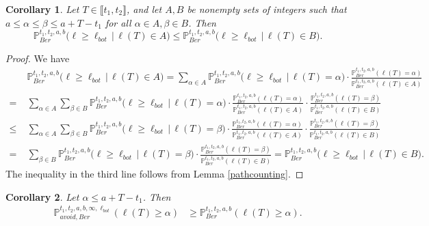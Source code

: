 \documentclass[12pt]{article}
\newtheorem{cor}{Corollary}
\begin{document}
	\begin{cor}\label{setpathcounting}
		Let $T\in\llbracket t_1, t_2\rrbracket$, and let $A, B$ be nonempty sets of integers such that $a \leq \alpha \leq \beta \leq a+T-t_1$ for all $\alpha\in A, \beta\in B$. Then
		\[
		\mathbb{P}^{t_1, t_2, a, b}_{Ber}\big(\ell \geq \ell_{bot}\,\big|\,\ell(T) \in A\big) \leq \mathbb{P}^{t_1, t_2, a, b}_{Ber}\big(\ell \geq \ell_{bot}\,\big|\,\ell(T) \in B\big).
		\]
	\end{cor}

	\begin{proof}
		We have
		\begin{align*}
			& \mathbb{P}^{t_1, t_2, a, b}_{Ber}\big(\ell \geq \ell_{bot}\,\big|\,\ell(T) \in A\big) = \sum_{\alpha\in A} \mathbb{P}^{t_1, t_2, a, b}_{Ber}\big(\ell \geq \ell_{bot}\,\big|\,\ell(T) = \alpha\big) \cdot \frac{\mathbb{P}^{t_1, t_2, a, b}_{Ber}(\ell(T) = \alpha)}{\mathbb{P}^{t_1, t_2, a, b}_{Ber}(\ell(T) \in A)}\\
			= \; & \sum_{\alpha\in A}\sum_{\beta\in B} \mathbb{P}^{t_1, t_2, a, b}_{Ber}\big(\ell \geq \ell_{bot}\,\big|\,\ell(T) = \alpha\big) \cdot \frac{\mathbb{P}^{t_1, t_2, a, b}_{Ber}(\ell(T) = \alpha)}{\mathbb{P}^{t_1, t_2, a, b}_{Ber}(\ell(T) \in A)} \cdot \frac{\mathbb{P}^{t_1, t_2, a, b}_{Ber}(\ell(T) = \beta)}{\mathbb{P}^{t_1, t_2, a, b}_{Ber}(\ell(T) \in B)}\\
			\leq \; & \sum_{\alpha\in A}\sum_{\beta\in B} \mathbb{P}^{t_1, t_2, a, b}_{Ber}\big(\ell \geq \ell_{bot}\,\big|\,\ell(T) = \beta\big) \cdot \frac{\mathbb{P}^{t_1, t_2, a, b}_{Ber}(\ell(T) = \alpha)}{\mathbb{P}^{t_1, t_2, a, b}_{Ber}(\ell(T) \in A)} \cdot \frac{\mathbb{P}^{t_1, t_2, a, b}_{Ber}(\ell(T) = \beta)}{\mathbb{P}^{t_1, t_2, a, b}_{Ber}(\ell(T) \in B)}\\
			= \; & \sum_{\beta \in B} \mathbb{P}^{t_1, t_2, a, b}_{Ber}\big(\ell \geq \ell_{bot}\,\big|\,\ell(T) = \beta\big) \cdot \frac{\mathbb{P}^{t_1, t_2, a, b}_{Ber}(\ell(T) = \beta)}{\mathbb{P}^{t_1, t_2, a, b}_{Ber}(\ell(T) \in B)} = \mathbb{P}^{t_1, t_2, a, b}_{Ber}\big(\ell \geq \ell_{bot}\,\big|\,\ell(T) \in B\big).
		\end{align*}
		The inequality in the third line follows from Lemma \ref{pathcounting}.
	\end{proof}

	\begin{cor}\label{freeavoidbound}
		Let $\alpha \leq a + T - t_1$. Then
		\begin{align*}
		\mathbb{P}^{t_1,t_2,a,b,\infty,\ell_{bot}}_{avoid,Ber} (\ell(T)\geq\alpha) &\geq \mathbb{P}^{t_1,t_2,a,b}_{Ber} (\ell(T)\geq \alpha).
		\end{align*}
	\end{cor}
\end{document}
